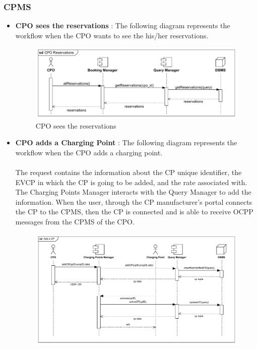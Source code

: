 \subsubsection{CPMS}
\begin{itemize}
    \item \textbf{CPO sees the reservations} : The following diagram represents the workflow when the CPO wants to see the his/her reservations.\\
          \begin{figure}[H]
              \centering
              \includegraphics[scale=0.55]{src/runtimeView/CPMS_Reservations.pdf}
              \caption{CPO sees the reservations}
          \end{figure}
          \pagebreak
    \item \textbf{CPO adds a Charging Point} : The following diagram represents the workflow when the CPO adds a charging point.\\
          \\ The request contains the information about the CP unique identifier, the EVCP in which the CP is going to be added, and the rate associated with.
          The Charging Points Manager interacts with the Query Manager to add the information. When the user, through the CP manufacturer's portal connects the
          CP to the CPMS, then the CP is connected and is able to receive OCPP messages from the CPMS of the CPO.
          \begin{figure}[H]
              \centering
              \includegraphics[scale=0.55]{src/runtimeView/CPMS_AddCP.pdf}

\end{figure}
\end{itemize}
